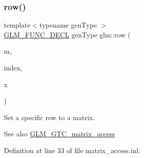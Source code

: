 \subsubsection{\texorpdfstring{row()}{row()}\hspace{0.1cm}{\footnotesize\ttfamily [2/2]}}
{\footnotesize\ttfamily template$<$typename gen\+Type $>$ \\
\hyperlink{setup_8hpp_ab2d052de21a70539923e9bcbf6e83a51}{G\+L\+M\+\_\+\+F\+U\+N\+C\+\_\+\+D\+E\+CL} gen\+Type glm\+::row (\begin{DoxyParamCaption}\item[{gen\+Type const \&}]{m,  }\item[{\hyperlink{namespaceglm_a090a0de2260835bee80e71a702492ed9}{length\+\_\+t} const \&}]{index,  }\item[{typename gen\+Type\+::row\+\_\+type const \&}]{x }\end{DoxyParamCaption})}

Set a specific row to a matrix. \begin{DoxySeeAlso}{See also}
\hyperlink{group__gtc__matrix__access}{G\+L\+M\+\_\+\+G\+T\+C\+\_\+matrix\+\_\+access} 
\end{DoxySeeAlso}


Definition at line 33 of file matrix\+\_\+access.\+inl.

